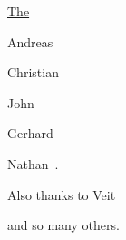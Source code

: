 \medskip

\noindent \uline{The }

\smallskip
Andreas~

Chris\-tian~ \dag 

John~

Gerhard~

Nathan~.

\medskip

Also thanks to Veit~

and so many others.

\bigskip
\Heart

